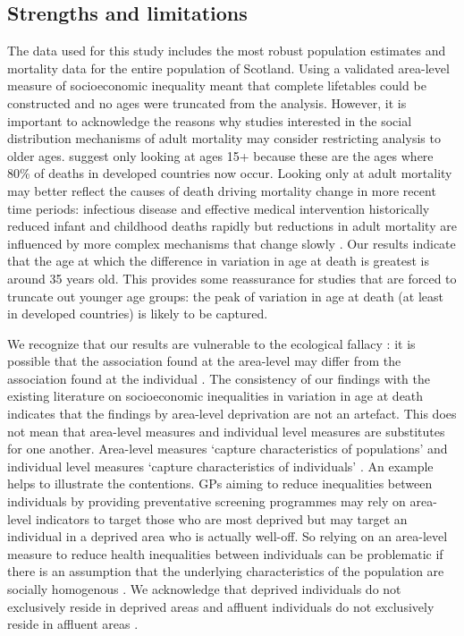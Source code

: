 \documentclass[12pt,oneside,a4paper]{article} %
\theoremstyle{definition}
\begin{document}
\subsection{Strengths and limitations}
The data used for this study includes the most robust population estimates and mortality data for the entire population of Scotland. Using a validated area-level measure of socioeconomic inequality meant that complete lifetables could be constructed and no ages were truncated from the analysis. However, it is important to acknowledge the reasons why studies interested in the social distribution mechanisms of adult mortality may consider restricting analysis to older ages. \citet{Smits2009} suggest only looking at ages 15+ because these are the ages where 80\% of deaths in developed countries now occur. Looking only at adult mortality may better reflect the causes of death driving mortality change in more recent time periods: infectious disease and effective medical intervention historically reduced infant and childhood deaths rapidly but reductions in adult mortality are influenced by more complex mechanisms that change slowly \citep{Smits2009,Vallin2004}. Our results indicate that the age at which the difference in variation in age at death is greatest is around 35 years old. This provides some reassurance for studies that are forced to truncate out younger age groups: the peak of variation in age at death (at least in developed countries) is likely to be captured. 

We recognize that our results are vulnerable to the ecological fallacy : it is possible that the association found at the area-level may differ from the association found at the individual \citep{Diez2002}. The consistency of our findings with the existing literature on socioeconomic inequalities in variation in age at death \citep{Broennum-Hansen2017,Raalte2014} indicates that the findings by area-level deprivation are not an artefact. This does not mean that area-level measures and individual level measures are substitutes for one another. Area-level measures ‘capture characteristics of populations’ and individual level measures ‘capture characteristics of individuals’ \citep{Leyland2007}. An example helps to illustrate the contentions. GPs aiming to reduce inequalities between individuals by providing preventative screening programmes may rely on area-level indicators to target those who are most deprived but may target an individual in a deprived area who is actually well-off. So relying on an area-level measure to reduce health inequalities between individuals can be problematic if there is an assumption that the underlying characteristics of the population are socially homogenous \citep{Fischbacher2014}. We acknowledge that deprived individuals do not exclusively reside in deprived areas and affluent individuals do not exclusively reside in affluent areas \citep{Leyland2007}.
\end{document}
